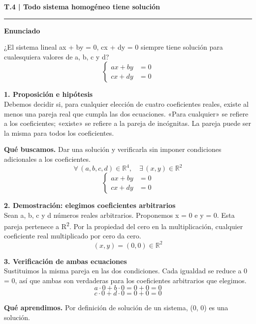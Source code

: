 \documentclass[11pt,a4paper,landscape]{article}
\newcommand{\titulo}[1]{{\LARGE\bfseries #1}\par\smallskip\hrule\medskip}
\begin{document}
\normalsize
\newpage{}\hypertarget{1.1-T.4}{}
\titulo{T.4 | Todo sistema homogéneo tiene solución}
\textbf{Enunciado}\par ¿El sistema lineal ax + by = 0, cx + dy = 0 siempre tiene solución para cualesquiera valores de a, b, c y d?
\[\left\{\begin{aligned}ax+by&=0\\cx+dy&=0\end{aligned}\right.\]
\par\medskip\large
\noindent\begin{minipage}{\linewidth}\textbf{1. Proposición e hipótesis}\\[2pt]Debemos decidir si, para cualquier elección de cuatro coeficientes reales, existe al menos una pareja real que cumpla las dos ecuaciones. «Para cualquier» se refiere a los coeficientes; «existe» se refiere a la pareja de incógnitas. La pareja puede ser la misma para todos los coeficientes.
\par\smallskip\textbf{Qué buscamos.} Dar una solución y verificarla sin imponer condiciones adicionales a los coeficientes.
\[\forall\,(a,b,c,d)\in\mathbb{R}^{4},\quad\exists\,(x,y)\in\mathbb{R}^{2}\]
\[\left\{\begin{aligned}ax+by&=0\\cx+dy&=0\end{aligned}\right.\]
\end{minipage}\par\medskip
\noindent\begin{minipage}{\linewidth}\textbf{2. Demostración: elegimos coeficientes arbitrarios}\\[2pt]Sean a, b, c y d números reales arbitrarios. Proponemos x = 0 e y = 0. Esta pareja pertenece a R\textsuperscript{2}. Por la propiedad del cero en la multiplicación, cualquier coeficiente real multiplicado por cero da cero.
\[(x,y)=(0,0)\in\mathbb{R}^{2}\]
\end{minipage}\par\medskip
\noindent\begin{minipage}{\linewidth}\textbf{3. Verificación de ambas ecuaciones}\\[2pt]Sustituimos la misma pareja en las dos condiciones. Cada igualdad se reduce a 0 = 0, así que ambas son verdaderas para los coeficientes arbitrarios que elegimos.
\[a\cdot0+b\cdot0=0+0=0\]
\[c\cdot0+d\cdot0=0+0=0\]
\par\smallskip\textbf{Qué aprendimos.} Por definición de solución de un sistema, (0, 0) es una solución.
\end{minipage}\par\medskip
\end{document}
